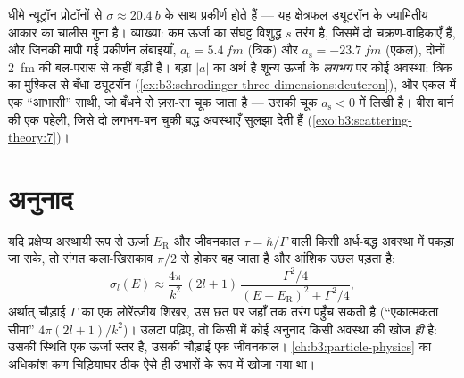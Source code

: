 \begin{example}[न्यूट्रॉन प्रोटॉन से मिलता है]\label{ex:b3:scattering-theory:np}
धीमे न्यूट्रॉन प्रोटॉनों से $\sigma \approx
\qty{20.4}{b}$ के साथ प्रकीर्ण होते हैं --- यह क्षेत्रफल ड्यूटरॉन के
ज्यामितीय आकार का चालीस गुना है। व्याख्या: कम ऊर्जा का संघट्ट विशुद्ध
$s$ तरंग है, जिसमें दो चक्रण-वाहिकाएँ हैं, और जिनकी मापी गई प्रकीर्णन
लंबाइयाँ, $a_{\text{t}} = \qty{5.4}{fm}$ (त्रिक) और $a_{\text{s}} =
\qty{-23.7}{fm}$ (एकल), दोनों \qty{2}{fm} की बल-परास से कहीं बड़ी
हैं। बड़ा $|a|$ का अर्थ है शून्य ऊर्जा के \emph{लगभग} पर कोई अवस्था:
त्रिक का मुश्किल से बँधा ड्यूटरॉन
(\cref{ex:b3:schrodinger-three-dimensions:deuteron}), और एकल में एक
``आभासी'' साथी, जो बँधने से ज़रा-सा चूक जाता है --- उसकी चूक
$a_{\text{s}} < 0$ में लिखी है। बीस बार्न की एक पहेली,
जिसे दो लगभग-बन चुकी बद्ध अवस्थाएँ सुलझा देती हैं
(\cref{exo:b3:scattering-theory:7})।
\end{example}

\section{अनुनाद}

\begin{proposition}[ब्राइट--विग्नर अनुनाद]\label{prop:b3:scattering-theory:resonance}
यदि प्रक्षेप्य अस्थायी रूप से ऊर्जा $E_{\text{R}}$ और जीवनकाल
$\tau = \hbar/\Gamma$ वाली किसी अर्ध-बद्ध अवस्था में पकड़ा जा सके,
तो संगत कला-खिसकाव $\pi/2$ से होकर बह जाता है और
आंशिक  उछल पड़ता है:
\[
\sigma_l(E) \approx \frac{4\pi}{k^2}\,(2l+1)\,
\frac{\Gamma^2/4}{(E - E_{\text{R}})^2 + \Gamma^2/4} ,
\]
अर्थात् चौड़ाई $\Gamma$ का एक लोरेंत्ज़ीय शिखर, उस छत पर जहाँ तक तरंग
पहुँच सकती है (``एकात्मकता सीमा'' $4\pi(2l+1)/k^2$)। उलटा पढ़िए, तो
किसी  में कोई अनुनाद किसी अवस्था की खोज \emph{ही} है:
उसकी स्थिति एक ऊर्जा स्तर है, उसकी चौड़ाई एक जीवनकाल।
\cref{ch:b3:particle-physics} का अधिकांश कण-चिड़ियाघर ठीक ऐसे ही
उभारों के रूप में खोजा गया था।
\end{proposition}
\admitted

